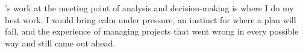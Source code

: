
\theshortname's work at the meeting point of analysis and decision-making is where I do my best work. I would bring calm under pressure, an instinct for where a plan will fail, and the experience of managing projects that went wrong in every possible way and still came out ahead.
